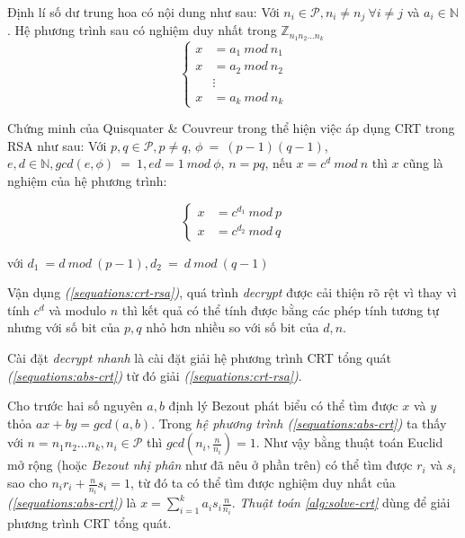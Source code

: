 Định lí số dư trung hoa có nội dung như sau: Với $n_i \in \mathcal{P}, n_i \neq n_j\ \forall i \neq j$ và $a_i \in \mathbb{N}$. Hệ phương trình sau có nghiệm 
duy nhất trong $\mathbb{Z}_{n_1n_2\hdots n_k}$
\begin{equation}\label{sequations:abs-crt}
\begin{cases}
x &= a_1\ mod\ n_1 \\
x &= a_2\ mod\ n_2 \\
& \vdots \\
x &= a_k\ mod\ n_k
\end{cases}
\end{equation}

Chứng minh của Quisquater \& Couvreur trong \cite{Quisquater1982} thể hiện việc áp dụng CRT trong RSA như sau: Với $p, q \in \mathcal{P}, p \neq q$, $\phi\ =\ (p -1)(q-1)$, 
$e,d \in \mathbb{N}, gcd(e,\phi)\ =\ 1, ed = 1\ mod\ \phi$, $n = pq$, nếu $x = c^d\ mod \ n$ thì $x$ cũng là nghiệm của hệ phương trình:

\begin{equation}\label{sequations:crt-rsa}
\begin{cases}
x &= c^{d_1}\ mod\ p \\
x &= c^{d_2}\ mod\ q
\end{cases}
\end{equation}
\begin{center}
với $d_1\ = d\ mod\ (p - 1), d_2\ =\ d\ mod\ (q - 1) $
\end{center}

Vận dụng \textit{(\ref{sequations:crt-rsa})}, quá trình \textit{decrypt} được cải thiện rõ rệt vì thay vì tính $c^d$ và modulo $n$ thì kết quả có thể tính 
được bằng các phép tính tương tự nhưng với số bit của $p, q$ nhỏ hơn nhiều so với số bit của $d, n$.

Cài đặt \textit{decrypt nhanh} là cài đặt giải hệ phương trình CRT tổng quát \textit{(\ref{sequations:abs-crt})} từ đó giải \textit{(\ref{sequations:crt-rsa})}. 

Cho trước hai số nguyên $a,b$ định lý Bezout phát biểu có thể tìm được $x$ và $y$ thỏa $ax + by = gcd(a,b)$. Trong \textit{hệ phương trình 
(\ref{sequations:abs-crt})} ta thấy với $n=n_1n_2\hdots n_k, n_i \in \mathcal{P}$ thì $gcd(n_i,\frac{n}{n_i}) = 1$. Như vậy bằng thuật toán Euclid mở rộng (hoặc \textit{Bezout nhị phân} \cite{giaotrinh} như đã nêu ở phần trên) có thể tìm được 
$r_i$ và $s_i$ sao cho $n_i r_i + \frac{n}{n_i} s_i = 1$, từ đó ta có thể tìm được nghiệm duy nhất của \textit{(\ref{sequations:abs-crt})} là $x = \sum_{i=1}^{k}a_is_i\frac{n}{n_i}$. 
\textit{Thuật toán \ref{alg:solve-crt}} dùng để giải phương trình CRT tổng quát.

